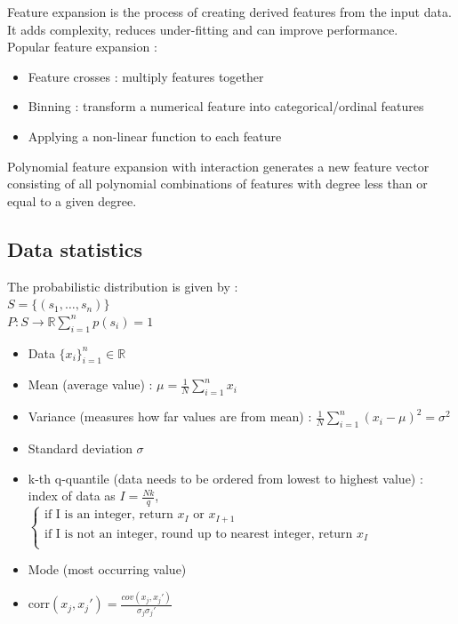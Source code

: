 \documentclass[../main.tex]{subfiles}
\begin{document}
Feature expansion is the process of creating derived features from the input data. It adds complexity, reduces under-fitting and can improve performance.\\
Popular feature expansion : \begin{itemize}
    \item Feature crosses : multiply features together\\
    \item Binning : transform a numerical feature into categorical/ordinal features\\
    \item Applying a non-linear function to each feature\\
\end{itemize}

Polynomial feature expansion with interaction generates a new feature vector consisting of all polynomial combinations of features with degree less than or equal to a given degree.\\


\subsection{Data statistics}
The probabilistic distribution is given by : \\
$S = \{(s_1,\dots, s_n)\}$\\
$P : S\rightarrow \mathbb{R} \sum_{i=1}^n p(s_i)=1$\\

\begin{itemize}
    \item Data $\{x_i\}_{i=1}^n \in \mathbb{R}$\\
    \item Mean (average value) : $\mu = \frac{1}{N} \sum_{i=1}^n x_i$\\
    \item Variance (measures how far values are from mean) : $\frac{1}{N} \sum_{i=1}^n (x_i-\mu)^2 = \sigma^2$\\
    \item Standard deviation $\sigma$\\
    \item k-th q-quantile (data needs to be ordered from lowest to highest value) : index of data as $I = \frac{Nk}{q}$, $\begin{cases}
        \text{if I is an integer, return }x_I \text{ or } x_{I+1}\\
        \text{if I is not an integer, round up to nearest integer, return } x_I\\
    \end{cases}$
    \item Mode (most occurring value)\\
    \item corr$(x_j, x_j') = \frac{cov(x_j, x_j')}{\sigma_j \sigma_j'}$\\
\end{itemize}
\end{document}
